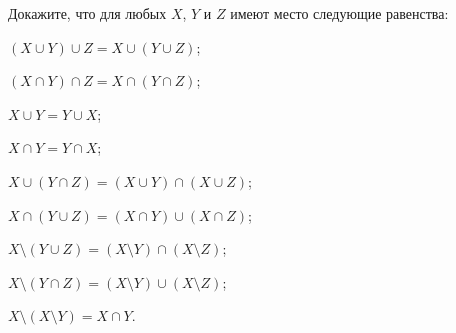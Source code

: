 Докажите, что для любых $X$, $Y$ и $Z$ имеют место следующие равенства:
\begin{enumtask}
    \item $\left( X \cup Y \right) \cup Z = X \cup \left( Y \cup Z \right)$;
    \item $\left( X \cap Y \right) \cap Z = X \cap \left( Y \cap Z \right)$;
        \begin{innerenum}
            \item $X \cup Y = Y \cup X$;
            \item $X \cap Y = Y \cap X$;
        \end{innerenum}
        \begin{innerenum}
            \item $X \cup \left( Y \cap Z \right) = \left( X \cup Y \right) \cap \left( X \cup Z
            \right)$;
            \item $X \cap \left( Y \cup Z \right) = \left( X \cap Y \right) \cup \left( X \cap Z
            \right)$;
        \end{innerenum}
        \begin{innerenum}
            \item $X \setminus \left( Y \cup Z \right) = \left( X \setminus Y \right) \cap \left( X \setminus Z \right)$;
            \item $X \setminus \left( Y \cap Z \right) = \left( X \setminus Y \right) \cup \left( X \setminus Z \right)$;
        \end{innerenum}            
    \item $X \setminus \left( X \setminus Y \right) = X \cap Y$.
\end{enumtask}
